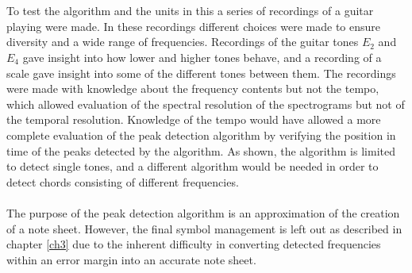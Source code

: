 \\ \\
To test the algorithm and the units in this a series of recordings of a guitar playing were made. In these recordings different choices were made to ensure diversity and a wide range of frequencies. Recordings of the guitar tones $E_2$ and $E_4$ gave insight into how lower and higher tones behave, and a recording of a scale gave insight into some of the different tones between them. The recordings were made with knowledge about the frequency contents but not the tempo, which allowed evaluation of the spectral resolution of the spectrograms but not of the temporal resolution. Knowledge of the tempo would have allowed a more complete evaluation of the peak detection algorithm by verifying the position in time of the peaks detected by the algorithm. As shown, the algorithm is limited to detect single tones, and a different algorithm would be needed in order to detect chords consisting of different frequencies.
\\ \\
The purpose of the peak detection algorithm is an approximation of the creation of a note sheet. However, the final symbol management is left out as described in chapter \ref{ch3} due to the inherent difficulty in converting detected frequencies within an error margin into an accurate note sheet.